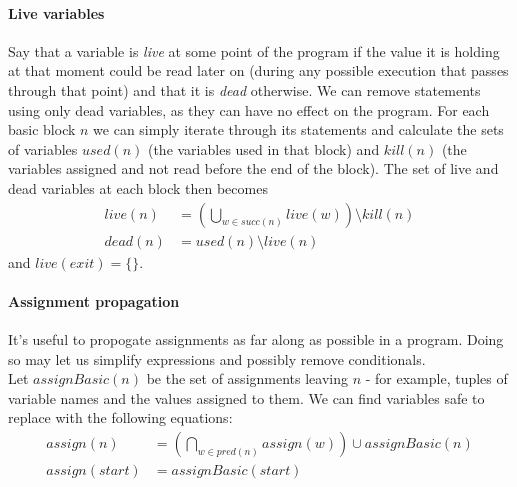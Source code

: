 \documentclass[12pt,a4paper]{article}
\begin{document}
\begin{enumerate}
\paragraph{Live variables}
 Say that a variable is \textit{live} at some point of the program if the value it is holding at that moment could be read later on (during any possible execution that passes through that point) and that it is \textit{dead} otherwise. We can remove statements using only dead variables,
as they can have no effect on the program. For each basic block $n$ we can simply iterate through its statements and calculate the sets of variables $used(n)$ (the variables used in that block) and $kill(n)$ (the variables
assigned and not read before the end of the block). The set of live and dead variables at each block then becomes
\begin{align*}
live(n)&= \left(\bigcup_{w\in succ(n)}live(w)\right) \setminus kill(n) \\
dead(n)&= used(n) \setminus live(n)
\end{align*}
and $live(exit) = \{\}$.

\paragraph{Assignment propagation}
It's useful to propogate assignments as far along as possible in a program. Doing so may let us simplify expressions and possibly remove conditionals.\\
Let $assignBasic(n)$ be the set of assignments leaving $n$ - for example, tuples of variable names and the values assigned to them. We can find variables safe to replace with the following equations:
\begin{align*}
assign(n)&= \left(\bigcap_{w\in pred(n)}assign(w)\right) \cup assignBasic(n) \\
assign(start)&= assignBasic(start)
\end{align*}

\end{enumerate}
\end{document}
